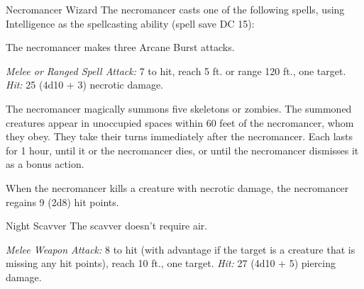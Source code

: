 \documentclass[10pt,a4paper,twoside,bg=print,twocolumn,openany,nodeprecatedcode]{dndbook}
\begin{document}
\begin{DndMonster}[float=t]{Necromancer Wizard}
\DndMonsterBasics[
armor-class = {12 (15 with \textit{mage armor})},
hit-points = {\DndDice{20d8 + 20}},
speed = {30 ft.}
]
\DndMonsterAbilityScores[
 str = 9,
 dex = 14,
 con = 12,
 int = 17,
 wis = 12,
 cha = 11
]
\DndMonsterDetails[
saving-throws = {Int +7, Wis +5},
skills = {Arcana +7, History +7},
damage-resistances = {necrotic},
languages = {any four languages},
challenge = 9,
]
The necromancer casts one of the following spells, using Intelligence as the spellcasting ability (spell save DC 15):
\begin{DndMonsterSpells}
\end{DndMonsterSpells}
The necromancer makes three Arcane Burst attacks.

\textsl{Melee or Ranged Spell Attack:} 7 to hit, reach 5 ft. or range 120 ft., one target. \textsl{Hit:} 25 (4d10 + 3) necrotic damage.

The necromancer magically summons five skeletons or zombies. The summoned creatures appear in unoccupied spaces within 60 feet of the necromancer, whom they obey. They take their turns immediately after the necromancer. Each lasts for 1 hour, until it or the necromancer dies, or until the necromancer dismisses it as a bonus action.

When the necromancer kills a creature with necrotic damage, the necromancer regains 9 (2d8) hit points. 

\end{DndMonster}



\begin{DndMonster}[float=t]{Night Scavver}
\DndMonsterBasics[
armor-class = {14 (natural armor)},
hit-points = {\DndDice{12d12 + 36}},
speed = {0 ft., fly 40 ft.}
]
\DndMonsterAbilityScores[
 str = 20,
 dex = 15,
 con = 17,
 int = 1,
 wis = 10,
 cha = 1
]
\DndMonsterDetails[
skills = {Perception +6, Stealth +8},
senses = {darkvision 120 ft., passive perception 16},
challenge = 5,
]
The scavver doesn't require air.

\textsl{Melee Weapon Attack:} 8 to hit (with advantage if the target is a creature that is missing any hit points), reach 10 ft., one target. \textsl{Hit:} 27 (4d10 + 5) piercing damage.

\end{DndMonster}
\end{document}
